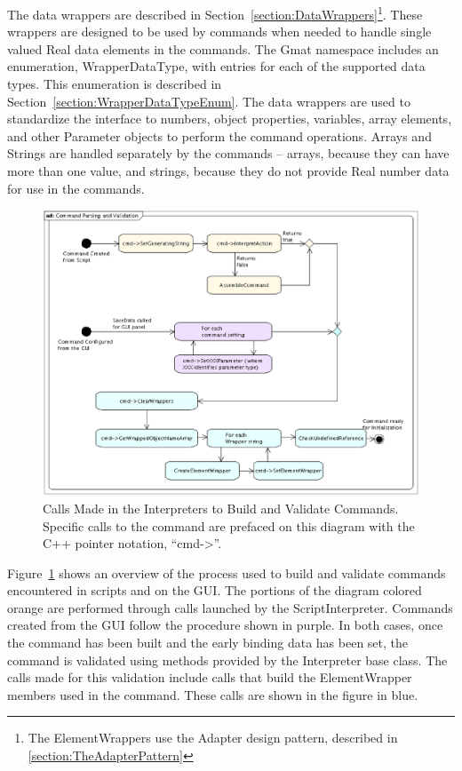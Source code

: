 The data wrappers are described in Section~\ref{section:DataWrappers}\footnote{The ElementWrappers
use the Adapter design pattern, described in \ref{section:TheAdapterPattern}}. These wrappers are
designed to be used by commands when needed to handle single valued Real data elements in the
commands.  The Gmat namespace includes an enumeration, WrapperDataType, with entries for each of the
supported data types.  This enumeration is described in Section~\ref{section:WrapperDataTypeEnum}.
The data wrappers are used to standardize the interface to numbers, object properties, variables,
array elements, and other Parameter objects to perform the command operations. Arrays and Strings
are handled separately by the commands -- arrays, because they can have more than one value, and
strings, because they do not provide Real number data for use in the commands.

\begin{figure}[htb]
\begin{center}
\includegraphics[scale=0.5]{Images/CommandParsingandValidation.eps}
\caption[Calls Made to Build and Validate Commands]{\label{figure:CommandParsingFlow}Calls Made in
the Interpreters to Build and Validate Commands.  Specific calls to the command are prefaced on this
diagram with the C++ pointer notation, ``cmd->''.}
\end{center}
\end{figure}

Figure~\ref{figure:CommandParsingFlow} shows an overview of the process used to build and validate
commands encountered in scripts and on the GUI.  The portions of the diagram colored orange are
performed through calls launched by the ScriptInterpreter.  Commands created from the GUI follow the
procedure shown in purple.  In both cases, once the command has been built and the early binding
data has been set, the command is validated using methods provided by the Interpreter base class.
The calls made for this validation include calls that build the ElementWrapper members used in the
command.  These calls are shown in the figure in blue.

